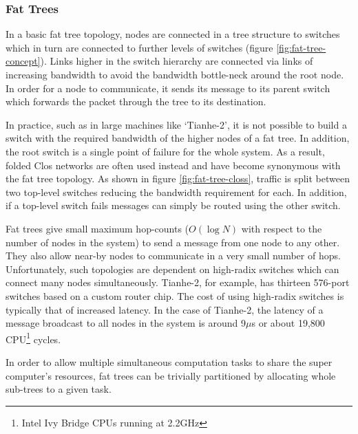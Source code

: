 			\subsubsection{Fat Trees}
			
				In a basic fat tree topology, nodes are connected in a tree structure to
				switches which in turn are connected to further levels of switches
				(figure \ref{fig:fat-tree-concept}). Links higher in the switch
				hierarchy are connected via links of increasing bandwidth to avoid the
				bandwidth bottle-neck around the root node. In order for a node to
				communicate, it sends its message to its parent switch which forwards
				the packet through the tree to its destination.
				
				In practice, such as in large machines like `Tianhe-2', it is not
				possible to build a switch with the required bandwidth of the higher
				nodes of a fat tree. In addition, the root switch is a single point of
				failure for the whole system. As a result, folded Clos networks are
				often used instead and have become synonymous with the fat tree
				topology. As shown in figure \ref{fig:fat-tree-closs}, traffic is split
				between two top-level switches reducing the bandwidth requirement for
				each. In addition, if a top-level switch fails messages can simply be
				routed using the other switch.
				
				Fat trees give small maximum hop-counts ($O(\log{N})$ with respect to
				the number of nodes in the system) to send a message from one node to
				any other. They also allow near-by nodes to communicate in a very small
				number of hops. Unfortunately, such topologies are dependent on
				high-radix switches which can connect many nodes simultaneously.
				Tianhe-2, for example, has thirteen 576-port switches based on a custom
				router chip. The cost of using high-radix switches is typically that of
				increased latency. In the case of Tianhe-2, the latency of a message
				broadcast to all nodes in the system is around 9$\mu$s or about 19,800
				CPU\footnote{Intel Ivy Bridge CPUs running at 2.2GHz}
				cycles\cite{dongarra13}.
				
				In order to allow multiple simultaneous computation tasks to share the
				super computer's resources, fat trees can be trivially partitioned by
				allocating whole sub-trees to a given task.
				
